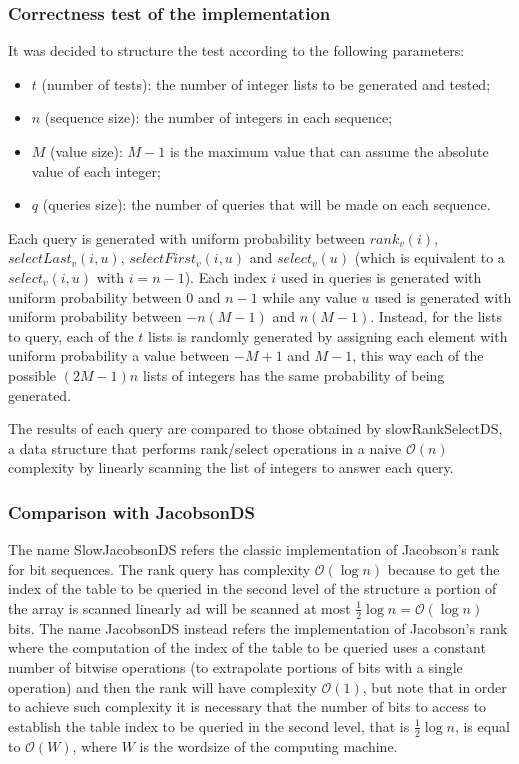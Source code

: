 \documentclass{article}
\begin{document}
\subsubsection{Correctness test of the implementation}
It was decided to structure the test according to the following parameters:
    \begin{itemize}
       \item $t$ (number of tests): the number of integer lists to be generated and tested;
        \item $n$ (sequence size):  the number of integers in each sequence;
        \item $M$ (value size): $M-1$ is the maximum value that can assume the absolute value of each integer;
        \item $q$ (queries size): the number of queries that will be made on each sequence.
    \end{itemize}
Each query is generated with uniform probability between $\mathit{rank}_v(i)$, $\mathit{selectLast}_v(i,u)$, $\mathit{selectFirst}_v(i,u)$ and $\mathit{select}_v(u)$ (which is equivalent to a $\mathit{select}_v(i,u)$ with $i=n-1$). Each index $i$ used in queries is generated with uniform probability between $0$ and $n-1$ while any value $u$ used is generated with uniform probability between $-n(M-1)$ and $n(M-1)$. Instead, for the lists to query, each of the $t$ lists is randomly generated by assigning each element with uniform probability a value between $-M+1$ and $M-1$, this way each of the possible $(2M-1)n$ lists of integers has the same probability of being generated.

The results of each query are compared to those obtained by slowRankSelectDS, a data structure that performs rank/select operations in a naive $\mathcal{O}(n)$ complexity by linearly scanning the list of integers to answer each query.

\subsubsection{Comparison with JacobsonDS}
The name SlowJacobsonDS refers the classic implementation of Jacobson’s rank for bit sequences. The rank query has complexity $\mathcal{O}(\log{n})$ because to get the index of the table to be queried in the second level of the structure a portion of the array is scanned linearly ad will be scanned at most $\frac{1}{2}\log{n} = \mathcal{O}(\log{n})$ bits. The name JacobsonDS instead refers the implementation of Jacobson's rank where the computation of the index of the table to be queried uses a constant number of bitwise operations (to extrapolate portions of bits with a single operation) and then the rank will have complexity $\mathcal{O}(1)$, but note that in order to achieve such complexity it is necessary that the number of bits to access to establish the table index to be queried in the second level, that is $\frac{1}{2}\log{n}$, is equal to $\mathcal{O}(W)$, where $W$ is the wordsize of the computing machine.
\end{document}
